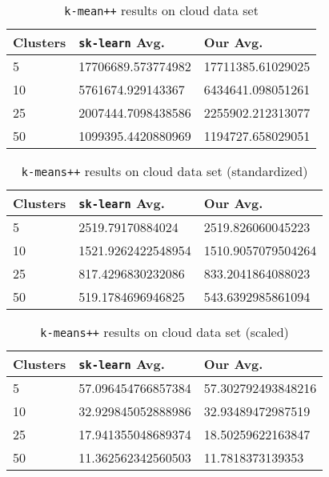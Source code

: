 \documentclass[twoside, 11pt]{article}
\begin{document}
		\begin{table}[p]
			\begin{center}
				\begin{tabular}{|l|l|l|}
					\hline
					Clusters & \texttt{sk-learn} Avg. & Our Avg.\\\hline
					5 & 17706689.573774982& 17711385.61029025\\\hline
					10 & 5761674.929143367& 6434641.098051261\\\hline
					25 & 2007444.7098438586& 2255902.212313077\\\hline
					50 & 1099395.4420880969& 1194727.658029051\\\hline
				\end{tabular}
				\caption{\texttt{k-mean++} results on cloud data set}
				\label{tbl:cloud_no_preprocess}
			\end{center}
		\end{table}

		\begin{table}[p]
			\begin{center}
				\begin{tabular}{|l|l|l|}
					\hline
					Clusters & \texttt{sk-learn} Avg. & Our Avg.\\\hline
					5 & 2519.79170884024 & 2519.826060045223\\\hline
					10 & 1521.9262422548954 & 1510.9057079504264\\\hline
					25 & 817.4296830232086 & 833.2041864088023\\\hline
					50 & 519.1784696946825 & 543.6392985861094\\\hline
				\end{tabular}
				\caption{\texttt{k-means++} results on cloud data set (standardized)}
				\label{tbl:cloud_standardscaler}
			\end{center}
		\end{table}

		\begin{table}[p]
			\begin{center}
				\begin{tabular}{|l|l|l|}
					\hline
					Clusters & \texttt{sk-learn} Avg. & Our Avg.\\\hline
					5 & 57.096454766857384 & 57.302792493848216\\\hline
					10 & 32.929845052888986 & 32.93489472987519\\\hline
					25 & 17.941355048689374 & 18.50259622163847\\\hline
					50 & 11.362562342560503 & 11.7818373139353\\\hline
				\end{tabular}
				\caption{\texttt{k-means++} results on cloud data set (scaled)}
				\label{tbl:cloud_minmaxscaler}
			\end{center}
		\end{table}
	\clearpage
\end{document}
